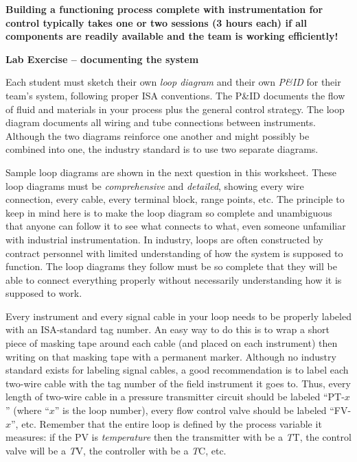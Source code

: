 \vskip 10pt

{\bf Building a functioning process complete with instrumentation for control typically takes one or two sessions (3 hours each) if all components are readily available and the team is working efficiently!}





\vfil \eject

\noindent
{\bf Lab Exercise -- documenting the system}

\vskip 5pt

Each student must sketch their own {\it loop diagram} and their own {\it P\&ID} for their team's system, following proper ISA conventions.  The P\&ID documents the flow of fluid and materials in your process plus the general control strategy.  The loop diagram documents all wiring and tube connections between instruments.  Although the two diagrams reinforce one another and might possibly be combined into one, the industry standard is to use two separate diagrams.

Sample loop diagrams are shown in the next question in this worksheet.  These loop diagrams must be {\it comprehensive} and {\it detailed}, showing every wire connection, every cable, every terminal block, range points, etc.  The principle to keep in mind here is to make the loop diagram so complete and unambiguous that anyone can follow it to see what connects to what, even someone unfamiliar with industrial instrumentation.  In industry, loops are often constructed by contract personnel with limited understanding of how the system is supposed to function.  The loop diagrams they follow must be so complete that they will be able to connect everything properly without necessarily understanding how it is supposed to work.

Every instrument and every signal cable in your loop needs to be properly labeled with an ISA-standard tag number.  An easy way to do this is to wrap a short piece of masking tape around each cable (and placed on each instrument) then writing on that masking tape with a permanent marker.  Although no industry standard exists for labeling signal cables, a good recommendation is to label each two-wire cable with the tag number of the field instrument it goes to.  Thus, every length of two-wire cable in a pressure transmitter circuit should be labeled ``PT-$x$'' (where ``$x$'' is the loop number), every flow control valve should be labeled ``FV-$x$'', etc.  Remember that the entire loop is defined by the process variable it measures: if the PV is {\it temperature} then the transmitter with be a {\it T}T, the control valve will be a {\it T}V, the controller with be a {\it T}C, etc.

